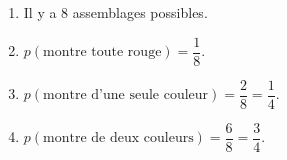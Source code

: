 
\medskip

\begin{enumerate}
\item Il y a 8 assemblages possibles.
\item  $p(\text{montre toute rouge}) = \dfrac{1}{8}$.
\item  $p(\text{montre d'une seule couleur}) = \dfrac{2}{8} = \dfrac{1}{4}$.
\item  $p(\text{montre de deux couleurs}) = \dfrac{6}{8} = \dfrac{3}{4}$.
\end{enumerate}

\vspace{0,5cm}

